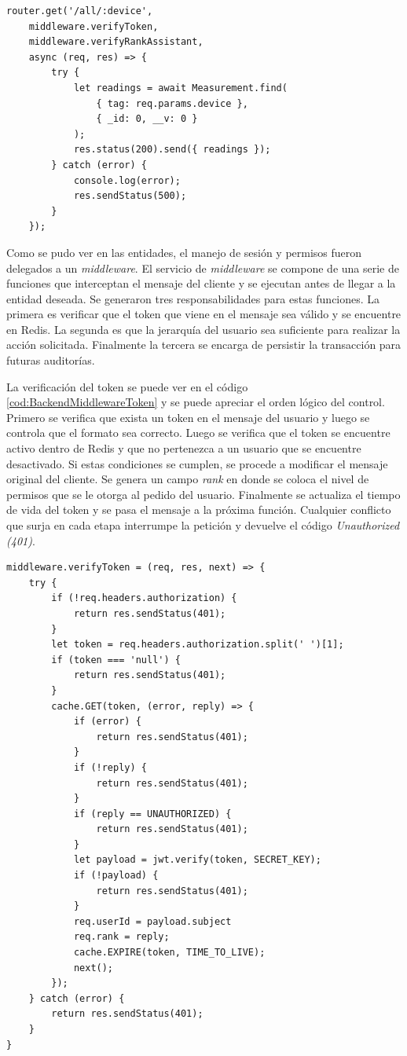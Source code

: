 \begin{lstlisting}[label=cod:BackendReadings,caption=Función más utilizada de la entidad readings]
router.get('/all/:device',
    middleware.verifyToken,
    middleware.verifyRankAssistant,
    async (req, res) => {
        try {
            let readings = await Measurement.find(
                { tag: req.params.device },
                { _id: 0, __v: 0 }
            );
            res.status(200).send({ readings });
        } catch (error) {
            console.log(error);
            res.sendStatus(500);
        }
    });
\end{lstlisting}

Como se pudo ver en las entidades, el manejo de sesión y permisos fueron delegados a un \emph{middleware}.
El servicio de \emph{middleware} se compone de una serie de funciones que interceptan el mensaje del cliente y se ejecutan antes de llegar a la entidad deseada.
Se generaron tres responsabilidades para estas funciones.
La primera es verificar que el token que viene en el mensaje sea válido y se encuentre en Redis.
La segunda es que la jerarquía del usuario sea suficiente para realizar la acción solicitada.
Finalmente la tercera se encarga de persistir la transacción para futuras auditorías.

La verificación del token se puede ver en el código \ref{cod:BackendMiddlewareToken} y se puede apreciar el orden lógico del control.
Primero se verifica que exista un token en el mensaje del usuario y luego se controla que el formato sea correcto.
Luego se verifica que el token se encuentre activo dentro de Redis y que no pertenezca a un usuario que se encuentre desactivado.
Si estas condiciones se cumplen, se procede a modificar el mensaje original del cliente.
Se genera un campo \emph{rank} en donde se coloca el nivel de permisos que se le otorga al pedido del usuario.
Finalmente se actualiza el tiempo de vida del token y se pasa el mensaje a la próxima función.
Cualquier conflicto que surja en cada etapa interrumpe la petición y devuelve el código \emph{Unauthorized (401)}.

\begin{lstlisting}[label=cod:BackendMiddlewareToken,caption=Verificación de token]
middleware.verifyToken = (req, res, next) => {
    try {
        if (!req.headers.authorization) {
            return res.sendStatus(401);
        }
        let token = req.headers.authorization.split(' ')[1];
        if (token === 'null') {
            return res.sendStatus(401);
        }
        cache.GET(token, (error, reply) => {
            if (error) {
                return res.sendStatus(401);
            }
            if (!reply) {
                return res.sendStatus(401);
            }
            if (reply == UNAUTHORIZED) {
                return res.sendStatus(401);
            }
            let payload = jwt.verify(token, SECRET_KEY);
            if (!payload) {
                return res.sendStatus(401);
            }
            req.userId = payload.subject
            req.rank = reply;
            cache.EXPIRE(token, TIME_TO_LIVE);
            next();
        });
    } catch (error) {
        return res.sendStatus(401);
    }
}
\end{lstlisting}

